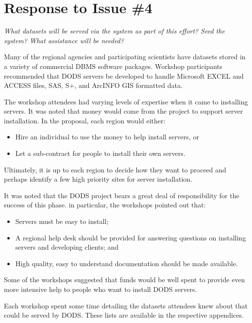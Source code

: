 \documentclass{report}
\newcommand{\pause}{\vspace{10pt}}
\begin{document}
\section{Response to Issue \#4}

\emph{What datasets will be served via the system as part of this effort?
Seed the system?  What assistance will be needed?}\pause

Many of the regional agencies and participating scientists have
datasets stored in a variety of commercial DBMS software packages.
Workshop participants recommended that DODS servers be developed to
handle Microsoft EXCEL and ACCESS files, SAS, S+, and ArcINFO GIS
formatted data.

The workshop attendees had varying levels of expertise when it came to
installing servers.  It was noted that money would come from the
project to support server installation.  In the proposal, each region
would either:

\begin{itemize}
\item Hire an individual to use the money to help install servers, or
\item Let a sub-contract for people to install their own servers.
\end{itemize}

Ultimately, it is up to each region to decide how they want to proceed
and perhaps identify a few high priority sites for server
installation.

It was noted that the DODS project bears a great deal of
responsibility for the success of this phase.  in particular, the
workshops pointed out that: 

\begin{itemize}
\item Servers must be easy to install;
\item A regional help desk should be provided for answering questions
  on installing servers and developing clients; and
\item High quality, easy to understand documentation should be made
  available.
\end{itemize}

Some of the workshops suggested that funds would be well spent to
provide even more intensive help to people who want to install DODS
servers.

Each workshop spent some time detailing the datasets attendees knew
about that could be served by DODS.  These lists are available in the
respective appendices.
\end{document}
